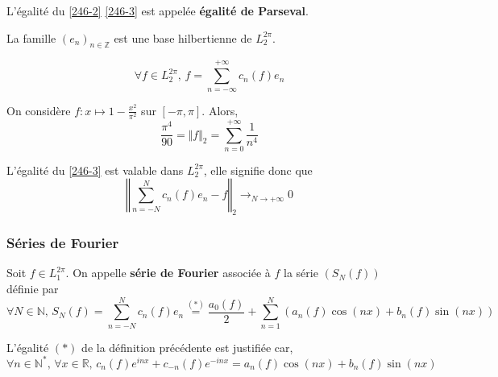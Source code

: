 	\begin{remark}
		L'égalité du \cref{246-2} \cref{246-3} est appelée \textbf{égalité de Parseval}.
	\end{remark}


	\begin{theorem}
		La famille $(e_n)_{n \in \mathbb{Z}}$ est une base hilbertienne de $L_2^{2 \pi}$.
	\end{theorem}

	\begin{corollary}
		\label{246-3}
		\[ \forall f \in L_2^{2 \pi}, \, f = \sum_{n = -\infty}^{+\infty} c_n(f) e_n \]
	\end{corollary}


	\begin{example}
		\label{246-5}
		On considère $f : x \mapsto 1 - \frac{x^2}{\pi^2}$ sur $[-\pi, \pi]$. Alors,
		\[ \frac{\pi^4}{90} = \Vert f \Vert_2 = \sum_{n=0}^{+\infty} \frac{1}{n^4} \]
	\end{example}


	\begin{remark}
		L'égalité du \cref{246-3} est valable dans $L_2^{2\pi}$, elle signifie donc que
		\[ \left\Vert \sum_{n = -N}^{N} c_n(f) e_n - f \right\Vert_2 \longrightarrow_{N \rightarrow +\infty} 0 \]
	\end{remark}

	\subsubsection{Séries de Fourier}


	\begin{definition}
		Soit $f \in L_1^{2\pi}$. On appelle \textbf{série de Fourier} associée à $f$ la série $(S_N(f))$ définie par
		\[ \forall N \in \mathbb{N}, \, S_N(f) = \sum_{n=-N}^{N} c_n(f) e_n \overset{(*)}{=} \frac{a_0(f)}{2} + \sum_{n = 1}^N (a_n(f) \cos(nx) + b_n(f) \sin(nx)) \]
	\end{definition}

	\begin{remark}
		L'égalité $(*)$ de la définition précédente est justifiée car,
		\[ \forall n \in \mathbb{N}^*, \, \forall x \in \mathbb{R}, \, c_n(f) e^{inx} + c_{-n}(f) e^{-inx} = a_n(f) \cos(nx) + b_n(f) \sin(nx) \]
	\end{remark}

